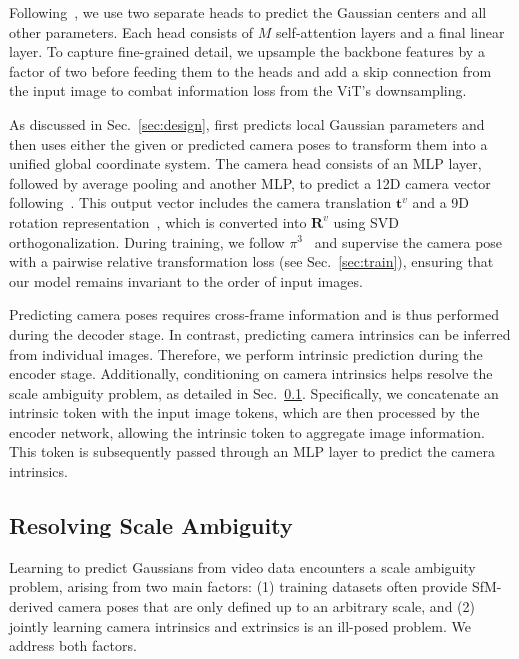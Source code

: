 Following~\citep{noposplat}, we use two separate heads to predict the Gaussian centers and all other parameters. Each head consists of $M$ self-attention layers and a final linear layer. To capture fine-grained detail, we upsample the backbone features by a factor of two before feeding them to the heads and add a skip connection from the input image to combat information loss from the ViT's downsampling.

As discussed in Sec.~\ref{sec:design}, \ourmethod{} first predicts local Gaussian parameters and then uses either the given or predicted camera poses to transform them into a unified global coordinate system. The camera head consists of an MLP layer, followed by average pooling and another MLP, to predict a 12D camera vector following~\citep{reloc3r, pi3}. This output vector includes the camera translation $\boldsymbol{t}^v$ and a 9D rotation representation~\citep{levinson2020analysis}, which is converted into $\boldsymbol{R}^v$ using SVD orthogonalization. During training, we follow $\pi^3$~\cite{pi3} and supervise the camera pose with a pairwise relative transformation loss (see Sec.~\ref{sec:train}), ensuring that our model remains invariant to the order of input images.

Predicting camera poses requires cross-frame information and is thus performed during the decoder stage. In contrast, predicting camera intrinsics can be inferred from individual images.
Therefore, we perform intrinsic prediction during the encoder stage. Additionally, conditioning on camera intrinsics helps resolve the scale ambiguity problem, as detailed in Sec.~\ref{sec:scale}.
Specifically, we concatenate an intrinsic token with the input image tokens, which are then processed by the encoder network, allowing the intrinsic token to aggregate image information. This token is subsequently passed through an MLP layer to predict the camera intrinsics.

\vspace{-1mm}
\subsection{Resolving Scale Ambiguity} \label{sec:scale}
\vspace{-3mm}

Learning to predict Gaussians from video data encounters a scale ambiguity problem, arising from two main factors:
(1) training datasets often provide SfM-derived camera poses that are only defined up to an arbitrary scale, and (2) jointly learning camera intrinsics and extrinsics is an ill-posed problem. We address both factors.

